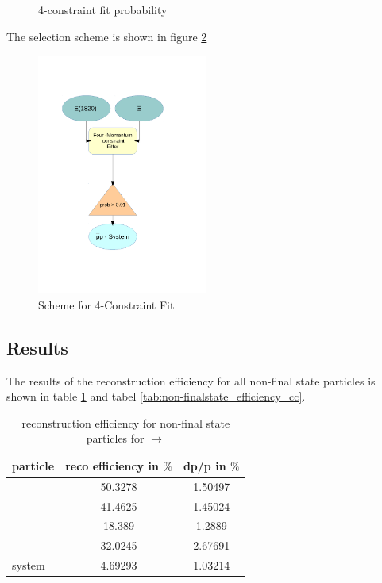 	\begin{figure}
		\centering
		\caption{4-constraint fit probability}
		\label{fig:xisys_prob}
	\end{figure}
	
	The selection scheme is shown in figure \ref{fig:fourconstraintfit}
	 
	\begin{figure}
		\centering
			\includegraphics[width=0.50\textwidth]{./plots/combineCascadeSys.pdf}
		\caption{Scheme for 4-Constraint Fit}
		\label{fig:fourconstraintfit}
	\end{figure}
	
	\subsection*{Results}
	
	The results of the reconstruction efficiency for all non-final state particles is shown in table \ref{tab:non-finalstate_efficiency}
	and tabel \ref{tab:non-finalstate_efficiency_cc}.
	
	\begin{table}
		\centering
		\caption{reconstruction efficiency for non-final state particles for \pbarpSystem $\rightarrow$ \excitedcascade \anticascade}
		\label{tab:non-finalstate_efficiency}
		
		\begin{tabular}{lcc}
		
			\hline
			particle & reco efficiency in $\%$ & dp/p in $\%$ \\\hline
			\hline
			\lam & 50.3278&   1.50497 \\
			\alam & 41.4625&   1.45024\\
			\anticascade & 18.389&   1.2889\\
			\excitedcascade & 32.0245&   2.67691 \\
			\excitedcascade \anticascade system & 4.69293&   1.03214\\\hline
			 	
		\end{tabular}
	\end{table}
	
